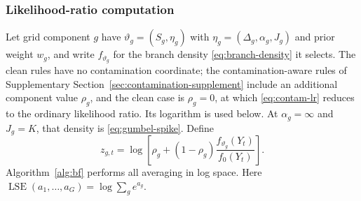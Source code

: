 \documentclass[11pt]{article}
\newcommand{\LSE}{\operatorname{LSE}}
\begin{document}
\subsubsection{Likelihood-ratio computation}

Let grid component $g$ have $\vartheta_g=(S_g,\eta_g)$ with $\eta_g=(\Delta_g,\alpha_g,J_g)$ and prior weight $w_g$, and write $f_{\vartheta_g}$ for the branch density \eqref{eq:branch-density} it selects.  The clean rules have no contamination coordinate; the contamination-aware rules of Supplementary Section~\ref{sec:contamination-supplement} include an additional component value $\rho_g$, and the clean case is $\rho_g=0$, at which \eqref{eq:contam-lr} reduces to the ordinary likelihood ratio.  Its logarithm is used below.  At $\alpha_g=\infty$ and $J_g=K$, that density is \eqref{eq:gumbel-spike}.  Define
\begin{equation}
  z_{g,t}=\log\left[\rho_g+(1-\rho_g)
  \frac{f_{\vartheta_g}(Y_t)}{f_0(Y_t)}\right].
  \label{eq:component-log-ratio}
\end{equation}
Algorithm~\ref{alg:bf} performs all averaging in log space.  Here $\LSE(a_1,\ldots,a_G)=\log\sum_g e^{a_g}$.
\end{document}
